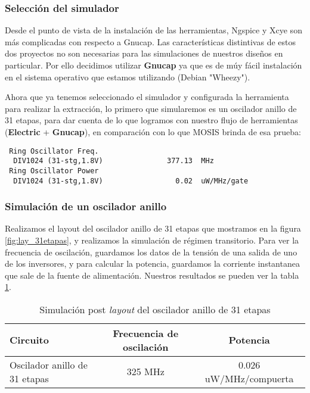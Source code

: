 \subsubsection{Selección del simulador}
Desde el punto de vista de la instalación de las herramientas, Ngspice y Xcye son más complicadas con respecto a Gnucap. Las características distintivas de estos dos proyectos no son necesarias para las simulaciones de nuestros diseños en particular. Por ello decidimos utilizar \textbf{Gnucap} ya que es de múy fácil instalación en el sistema operativo que estamos utilizando (Debian "Wheezy"). 

Ahora que ya tenemos seleccionado el simulador y configurada la herramienta para realizar la extracción, lo primero que simularemos es un oscilador anillo de 31 etapas, para dar cuenta de lo que logramos con nuestro flujo de herramientas (\textbf{Electric} + \textbf{Gnucap}), en comparación con lo que MOSIS brinda de esa prueba:

\begin{footnotesize}
\begin{verbatim}
 Ring Oscillator Freq.                                   
  DIV1024 (31-stg,1.8V)               377.13  MHz        
 Ring Oscillator Power                                   
  DIV1024 (31-stg,1.8V)                 0.02  uW/MHz/gate
\end{verbatim}
\end{footnotesize}

\subsubsection{Simulación de un oscilador anillo}
Realizamos el layout del oscilador anillo de 31 etapas que mostramos en la figura \ref{fig:lay_31etapas}, y realizamos la simulación de régimen transitorio. Para ver la frecuencia de oscilación, guardamos los datos de la tensión de una salida de uno de los inversores, y para calcular la potencia, guardamos la corriente instantanea que sale de la fuente de alimentación. Nuestros resultados se pueden ver la tabla \ref{tab:RO31}.

\begin{table}[h]
\vspace{0.3cm}
\centering
\begin{tabular}{@{}lcc@{}}
\toprule
Circuito	&	Frecuencia de oscilación	&	Potencia \\ \midrule
Oscilador anillo de 31 etapas               & 325 MHz	& 0.026 uW/MHz/compuerta   \\ \bottomrule
\end{tabular}
\caption{Simulación post \emph{layout} del oscilador anillo de 31 etapas}
\label{tab:RO31}
\end{table}

